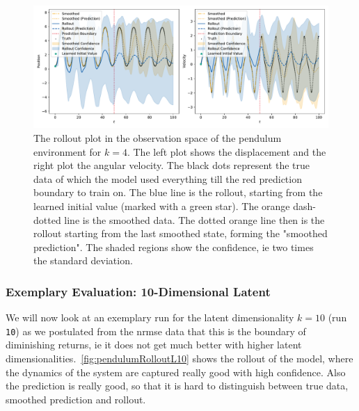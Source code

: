 			\begin{figure}
				\centering
				\includegraphics[width=\linewidth]{figures/results/pendulum/run-latent-dim-04/rollout-observations-N0.pdf}
				\caption{The rollout plot in the observation space of the pendulum environment for \(k = 4\). The left plot shows the displacement and the right plot the angular velocity. The black dots represent the true data of which the model used everything till the red prediction boundary to train on. The blue line is the rollout, starting from the learned initial value (marked with a green star). The orange dash-dotted line is the smoothed data. The dotted orange line then is the rollout starting from the last smoothed state, forming the "smoothed prediction". The shaded regions show the confidence, \ac{ie} two times the standard deviation.}
				\label{fig:pendulumRolloutL04}
			\end{figure}

		\subsubsection{Exemplary Evaluation: 10-Dimensional Latent}
			\label{subsubsec:pendulumL10}

			We will now look at an exemplary run for the latent dimensionality \( k = 10 \) (run \texttt{10}) as we postulated from the \ac{nrmse} data that this is the boundary of diminishing returns, \ac{ie} it does not get much better with higher latent dimensionalities.~\autoref{fig:pendulumRolloutL10} shows the rollout of the model, where the dynamics of the system are captured really good with high confidence. Also the prediction is really good, so that it is hard to distinguish between true data, smoothed prediction and rollout.

